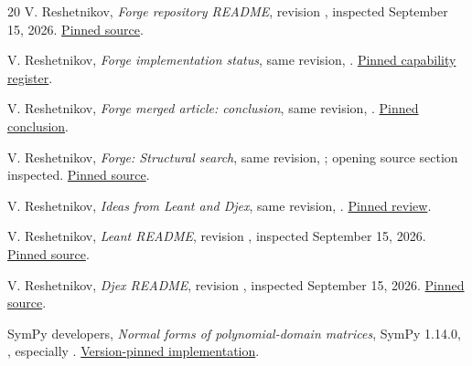 \documentclass[11pt,letterpaper]{article}
\theoremstyle{definition}\newtheorem{definition}[theorem]{Definition}
\theoremstyle{remark}\newtheorem{remark}[theorem]{Remark}
\newcommand{\code}[1]{\texttt{\detokenize{#1}}}
\begin{document}
\begin{thebibliography}{20}
V. Reshetnikov, \emph{Forge repository README}, revision
, inspected September 15, 2026.
\href{https://github.com/VladimirReshetnikov/Forge/blob/58ea206bd7ad501b930add568151217bcc7f82a2/README.md}{Pinned source}.

V. Reshetnikov, \emph{Forge implementation status}, same revision,
.
\href{https://github.com/VladimirReshetnikov/Forge/blob/58ea206bd7ad501b930add568151217bcc7f82a2/docs/STATUS.md}{Pinned capability register}.

V. Reshetnikov, \emph{Forge merged article: conclusion}, same
revision, .
\href{https://github.com/VladimirReshetnikov/Forge/blob/58ea206bd7ad501b930add568151217bcc7f82a2/article/sections/15-conclusion.tex}{Pinned conclusion}.

V. Reshetnikov, \emph{Forge: Structural search}, same revision,
; opening source section inspected.
\href{https://github.com/VladimirReshetnikov/Forge/blob/58ea206bd7ad501b930add568151217bcc7f82a2/article/sections/05-structural.tex}{Pinned source}.

V. Reshetnikov, \emph{Ideas from Leant and Djex}, same revision,
.
\href{https://github.com/VladimirReshetnikov/Forge/blob/58ea206bd7ad501b930add568151217bcc7f82a2/docs/IDEAS-FROM-LEANT-DJEX.md}{Pinned review}.

V. Reshetnikov, \emph{Leant README}, revision
, inspected September 15, 2026.
\href{https://github.com/VladimirReshetnikov/Leant/blob/6bf05ad78c467989e68290f2d08bbed40802d485/README.md}{Pinned source}.

V. Reshetnikov, \emph{Djex README}, revision
, inspected September 15, 2026.
\href{https://github.com/VladimirReshetnikov/Djex/blob/e8778f4ebd63e1f9b9b410fa4de8d14a8a04c9e5/README.md}{Pinned source}.

SymPy developers, \emph{Normal forms of polynomial-domain matrices}, SymPy
1.14.0, , especially
\code{smith_normal_decomp}.
\href{https://github.com/sympy/sympy/blob/sympy-1.14.0/sympy/polys/matrices/normalforms.py}{Version-pinned implementation}.


\end{thebibliography}
\end{document}
